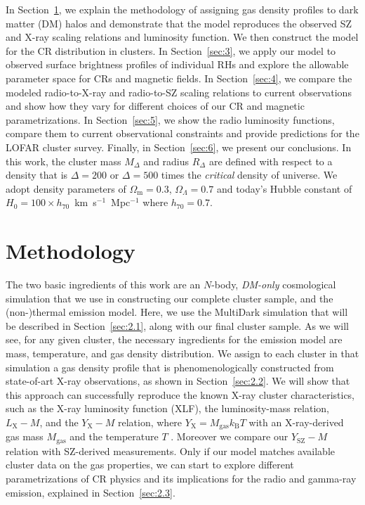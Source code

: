 \documentclass[traditabstract]{aa}
\newcommand{\rmn}{\mathrm}
\begin{document}
In Section~\ref{sec:2}, we explain the methodology of assigning gas density
profiles to dark matter (DM) halos and demonstrate that the model reproduces the
observed SZ and X-ray scaling relations and luminosity function. We then
construct the model for the CR distribution in clusters. In Section~\ref{sec:3},
we apply our model to observed surface brightness profiles of individual RHs and
explore the allowable parameter space for CRs and magnetic fields. In
Section~\ref{sec:4}, we compare the modeled radio-to-X-ray and radio-to-SZ
scaling relations to current observations and show how they vary for different
choices of our CR and magnetic parametrizations. In Section~\ref{sec:5}, we show
the radio luminosity functions, compare them to current observational
constraints and provide predictions for the LOFAR cluster survey. Finally, in
Section~\ref{sec:6}, we present our conclusions. In this work, the cluster mass
$M_{\Delta}$ and radius $R_{\Delta}$ are defined with respect to a density that
is $\Delta=200$ or $\Delta=500$ times the \emph{critical} density of
universe. We adopt density parameters of $\Omega_{\rmn{m}}=0.3$,
$\Omega_{\Lambda}=0.7$ and today's Hubble constant of $H_0 = 100 \times
h_{70}$~km~s$^{-1}$~Mpc$^{-1}$ where $h_{70} = 0.7$.


\section{Methodology}
\label{sec:2}
The two basic ingredients of this work are an $N$-body, \emph{DM-only}
cosmological simulation that we use in constructing our complete cluster sample,
and the (non-)thermal emission model. Here, we use the MultiDark simulation that
will be described in Section~\ref{sec:2.1}, along with our final cluster
sample. As we will see, for any given cluster, the necessary ingredients for the
emission model are mass, temperature, and gas density distribution. We assign to
each cluster in that simulation a gas density profile that is phenomenologically
constructed from state-of-art X-ray observations, as shown in
Section~\ref{sec:2.2}. We will show that this approach can successfully
reproduce the known X-ray cluster characteristics, such as the X-ray luminosity
function (XLF), the luminosity-mass relation, $L_{\rmn{X}}- M$, and the
$Y_{\rmn{X}}-M$ relation, where $Y_{\rmn{X}}=M_\rmn{gas}k_{\rmn{B}}T$ with an
X-ray-derived gas mass $M_{\rmn{gas}}$ and the temperature $T$
\citep{2006ApJ...650..128K}. Moreover we compare our $Y_{\rmn{SZ}}-M$ relation
with SZ-derived measurements.  Only if our model matches available cluster data
on the gas properties, we can start to explore different parametrizations of CR
physics and its implications for the radio and gamma-ray emission, explained in
Section~\ref{sec:2.3}.
\end{document}
